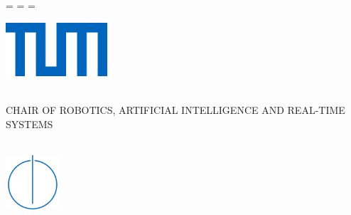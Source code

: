 \begin{titlepage}
  \oddsidemargin=\evensidemargin\relax
  \textwidth=\dimexpr{}\evensidemargin-2in\relax
  \hsize=\textwidth\relax

  \centering


  \includegraphics[height=20mm]{media/logo_tum.png}


  \vspace{5mm}
  {\huge\MakeUppercase{\getFaculty{}}}\\
  
  
  \vspace{5mm}
  {\large\MakeUppercase{Chair of Robotics, Artificial Intelligence and Real-time Systems}}\\
  

  \vspace{5mm}
  {\large\MakeUppercase{\getUniversity{}}}\\

  \vspace{20mm}
  {\Large \getDoctype{}}

  \vspace{15mm}
  \makeatletter
  {\huge\bfseries \getTitle{}}
  {\huge\bfseries \getTitleGer{}}
  \makeatother

  \vspace{15mm}
  {\LARGE \getAuthor{}}
    \vfill{}
 \includegraphics[height=20mm]{media/logo_faculty.png}

\end{titlepage}
